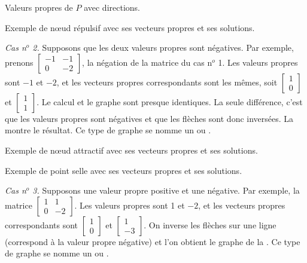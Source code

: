 \begin{myfig}
\parbox[t]{3.0in}{
 \capstart
 \caption{Valeurs propres de $P$ avec directions.\label{pln:source-eig-arrfig}}
}
\quad
\parbox[t]{3.0in}{
 \capstart
 \caption{Exemple de nœud répulsif avec ses vecteurs propres et ses
 solutions.\label{pln:source-fullfig}}
}
\end{myfig}

\medskip

\emph{Cas n$^o$ 2.} Supposons que les deux valeurs propres sont négatives. Par exemple, prenons
$\left[ \begin{smallmatrix} -1 & -1 \\ 0 & -2 \end{smallmatrix} \right]$, la négation de la matrice du cas n$^o$ 1.
Les valeurs propres sont $-1$ et $-2$, et les vecteurs propres correspondants sont les mêmes, soit
$\left[ \begin{smallmatrix} 1 \\ 0 \end{smallmatrix} \right]$ et
$\left[ \begin{smallmatrix} 1 \\ 1 \end{smallmatrix} \right]$. Le calcul et le graphe sont presque identiques. La seule différence, c'est que les valeurs propres sont négatives et que les flèches sont donc inversées. La  montre le résultat. Ce type de graphe se nomme un \emph{} ou \emph{}.

\begin{myfig}
\parbox[t]{3.0in}{
 \capstart
 \caption{Exemple de nœud attractif avec ses vecteurs propres et ses
 solutions.\label{pln:sink-fullfig}}
}
\quad
\parbox[t]{3.0in}{
 \capstart
 \caption{Exemple de point selle avec ses vecteurs propres et ses
 solutions.\label{pln:saddle-fullfig}}
}
\end{myfig}

\medskip

\emph{Cas n$^o$ 3.} Supposons une valeur propre positive et une négative. Par exemple, la matrice
$\left[ \begin{smallmatrix} 1 & 1 \\ 0 & -2 \end{smallmatrix} \right]$.
Les valeurs propres sont 1 et $-2$, et les vecteurs propres correspondants sont
$\left[ \begin{smallmatrix} 1 \\ 0 \end{smallmatrix} \right]$ et
$\left[ \begin{smallmatrix} 1 \\ -3 \end{smallmatrix} \right]$. On inverse les flèches sur une ligne (correspond à la valeur propre négative) et l'on obtient le graphe de la . Ce type de graphe se nomme un \emph{} ou \emph{}.

